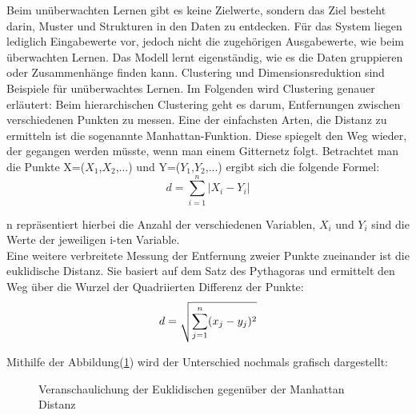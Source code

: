 Beim unüberwachten Lernen gibt es keine Zielwerte, sondern das Ziel besteht
darin, Muster und Strukturen in den Daten zu entdecken. Für das System liegen
lediglich Eingabewerte vor, jedoch nicht die zugehörigen Ausgabewerte, wie beim
überwachten Lernen.\cite{lanquillon2019grundzuge} Das Modell lernt eigenständig,
wie es die Daten gruppieren oder Zusammenhänge finden kann. Clustering und
Dimensionsreduktion sind Beispiele für unüberwachtes Lernen. Im Folgenden wird
Clustering genauer erläutert: Beim hierarchischen Clustering geht es darum,
Entfernungen zwischen verschiedenen Punkten zu messen. Eine der einfachsten
Arten, die Distanz zu ermitteln ist die sogenannte Manhattan-Funktion. Diese
spiegelt den Weg wieder, der gegangen werden müsste, wenn man einem Gitternetz
folgt. Betrachtet man die Punkte X=($X_1$,$X_2$,...) und Y=($Y_1$,$Y_2$,...)
ergibt sich die folgende Formel:
\begin{equation*}
    d = \sum_{i=1}^n |X_i -Y_i|
\end{equation*}

n repräsentiert hierbei die Anzahl der verschiedenen Variablen, $X_i$ und $Y_i$
sind die Werte der jeweiligen i-ten Variable.\\

Eine weitere verbreitete Messung der Entfernung zweier Punkte zueinander ist
die euklidische Distanz. Sie basiert auf dem Satz des Pythagoras und ermittelt
den Weg über die Wurzel der Quadriierten Differenz der Punkte:
\begin{equation*}
    \let\oldsqrt\sqrt
    d = \sqrt{\sum_{j=1}^n (x_j-y_j)^2}
\end{equation*}
\cite{madhulatha2012overview}

Mithilfe der Abbildung(\ref{fig:dist}) wird der Unterschied nochmals grafisch
dargestellt:
\begin{figure}[!h]
    \centering
    
    \caption[width=0.7\columnwidth]{Veranschaulichung der Euklidischen gegenüber der Manhattan Distanz}
    \label{fig:dist}
\end{figure}